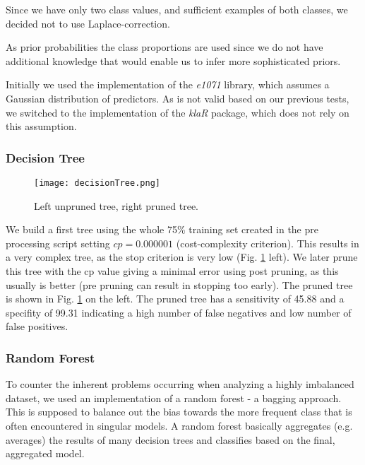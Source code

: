 \documentclass[a4paper]{article}
\begin{document}
Since we have only two class values, and sufficient examples of both classes, we decided not to use Laplace-correction.

As prior probabilities the class proportions are used since we do not have additional knowledge that would enable us to infer more sophisticated priors.

Initially we used the implementation of the \textit{e1071} library, which assumes a Gaussian distribution of predictors. As is not valid based on our previous tests, we switched to the implementation of the \textit{klaR} package, which does not rely on this assumption.


\subsubsection{Decision Tree}
 \begin{figure}[H]
 	\centering
 	\texttt{[image: decisionTree.png]}
 	\caption{\label{fig:decisionTree} Left unpruned tree, right pruned tree.}
 \end{figure}

We build a first tree using the whole 75\% training set created in the pre processing script setting $cp = 0.000001$ (cost-complexity criterion). This results in a very complex tree, as the stop criterion is very low (Fig. \ref{fig:decisionTree} left). We later prune this tree with the cp value giving a minimal error using post pruning, as this usually is better (pre pruning can result in stopping too early). The pruned tree is shown in Fig. \ref{fig:decisionTree} on the left. 
The pruned tree has a sensitivity of 45.88 and a specifity of  99.31 indicating a high number of false negatives and low number of false positives.
 
\subsubsection{Random Forest}
To counter the inherent problems occurring when analyzing a highly imbalanced dataset, we used an implementation of a random forest - a bagging approach. This is supposed to balance out the bias towards the more frequent class that is often encountered in singular models. A random forest basically aggregates (e.g. averages) the results of many decision trees and classifies based on the final, aggregated model.
\end{document}
